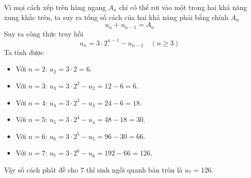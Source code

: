 \begin{ex}
{\begin{itemize}
\end{itemize}
Vì mọi cách xếp trên hàng ngang $A_n$ chỉ có thể rơi vào một trong hai khả năng xung khắc trên, ta suy ra tổng số cách của hai khả năng phải bằng chính $A_n$
\[u_n+u_{n-1}=A_n\]
Suy ra công thức truy hồi
\[u_n=3 \cdot 2^{n-1}-u_{n-1} \quad(n \geq 3)\]
Ta tính được
\begin{itemize}
	\item Với $n=2$: $u_2 = 3 \cdot 2 = 6$.
	\item Với $n=3$: $u_3 = 3 \cdot 2^2 - u_2 = 12 - 6 = 6$.
	\item Với $n=4$: $u_4 = 3 \cdot 2^3 - u_3 = 24 - 6 = 18$.
	\item Với $n=5$: $u_5 = 3 \cdot 2^4 - u_4 = 48 - 18 = 30$.
	\item Với $n=6$: $u_6 = 3 \cdot 2^5 - u_5 = 96 - 30 = 66$.
	\item Với $n=7$: $u_7 = 3 \cdot 2^6 - u_6 = 192 - 66 = 126$.
\end{itemize}
Vậy số cách phát đề cho $7$ thí sinh ngồi quanh bàn tròn là
$u_7= 126$.
}
\end{ex}
